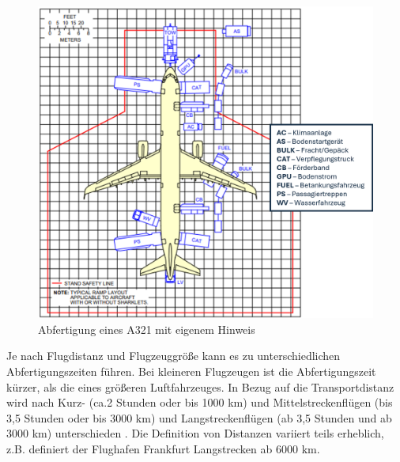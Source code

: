 \begin{figure}[h]
	\centering
	\includegraphics[width=0.8\linewidth]{Bilder/A321_Abfertigung.png}
	\caption[Abfertigung]{Abfertigung eines A321 \cite{airbus2022a321} mit eigenem Hinweis}
	\label{abfertigung}
\end{figure}

Je nach Flugdistanz und Flugzeuggröße kann es zu unterschiedlichen Abfertigungszeiten führen. 
Bei kleineren Flugzeugen ist die Abfertigungszeit kürzer, als die eines größeren Luftfahrzeuges. 
In Bezug auf die Transportdistanz wird nach Kurz- (ca.2 Stunden oder bis 1000 km) 
und Mittelstreckenflügen (bis 3,5 Stunden oder bis 3000 km) und 
Langstreckenflügen (ab 3,5 Stunden und ab 3000 km) unterschieden \cite{mensen2013handbuch}.
Die Definition von Distanzen variiert teils erheblich, 
z.B. definiert der Flughafen Frankfurt Langstrecken ab 6000 km.%


